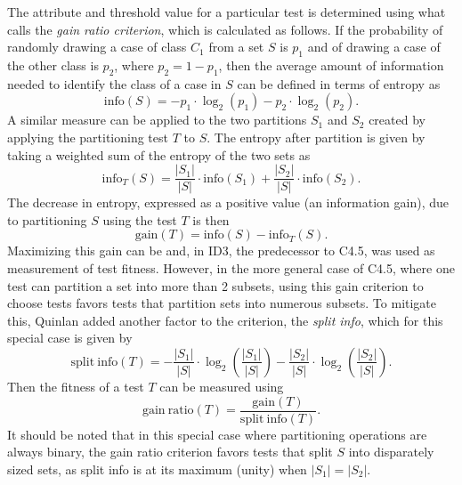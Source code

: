 \documentclass[main.tex]{subfiles}
\begin{document}
The attribute and threshold value for a particular test is determined using what \citet{quinlan:1993} calls the \textit{gain ratio criterion}, which is calculated as follows. If the probability of randomly drawing a case of class $C_1$ from a set $S$ is $p_1$ and of drawing a case of the other class is $p_2$, where $p_2 = 1-p_1$, then the average amount of information needed to identify the class of a case in $S$ can be defined in terms of entropy as
\begin{equation}
\mathrm{info}(S)=-p_1 \cdot \log_2(p_1) - p_2 \cdot \log_2(p_2).
\end{equation}
A similar measure can be applied to the two partitions $S_1$ and $S_2$ created by applying the partitioning test $T$ to $S$. The entropy after partition is given by taking a weighted sum of the entropy of the two sets as
\begin{equation}
\mathrm{info}_T(S)=\frac{|S_1|}{|S|} \cdot \mathrm{info}(S_1) + \frac{|S_2|}{|S|} \cdot \mathrm{info}(S_2).
\end{equation}
The decrease in entropy, expressed as a positive value (an information gain), due to partitioning $S$ using the test $T$ is then
\begin{equation}
\mathrm{gain}(T)=\mathrm{info}(S)-\mathrm{info}_T(S).
\end{equation}
Maximizing this gain can be and, in ID3, the predecessor to C4.5, was used as measurement of test fitness. However, in the more general case of C4.5, where one test can partition a set into more than 2 subsets, using this gain criterion to choose tests favors tests that partition sets into numerous subsets. To mitigate this, Quinlan added another factor to the criterion, the \textit{split info}, which for this special case is given by
\begin{equation}
\mathrm{split\ info}(T)= -\frac{|S_1|}{|S|} \cdot \log_2 \left( \frac{|S_1|}{|S|} \right) - \frac{|S_2|}{|S|} \cdot \log_2  \left( \frac{|S_2|}{|S|}  \right).
\end{equation}
Then the fitness of a test $T$ can be measured using
\begin{equation}
\mathrm{gain\ ratio}(T) = \frac{\mathrm{gain}(T)}{\mathrm{split\ info}(T)}.
\end{equation}
It should be noted that in this special case where partitioning operations are always binary, the gain ratio criterion favors tests that split $S$ into disparately sized sets, as split info is at its maximum (unity) when $|S_1|=|S_2|$.
\end{document}
